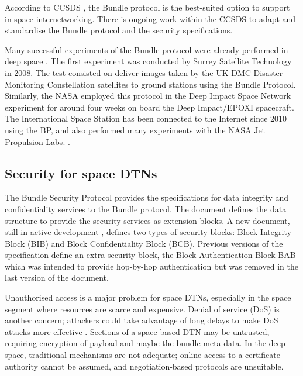 According to CCSDS \cite{rationale2010requirements}, the Bundle protocol is the best-suited option to support in-space internetworking. There is ongoing work within the CCSDS to adapt and standardise the Bundle protocol and the security specifications. %

Many successful experiments of the Bundle protocol were already performed in deep space  \cite{ivancic2010experience}. The first experiment was conducted by Surrey Satellite Technology in 2008. The test consisted on deliver images taken by the UK-DMC Disaster Monitoring Constellation satellites to ground stations using the Bundle Protocol. Similarly, the NASA employed this protocol in the Deep Impact Space Network experiment for around four weeks on board the Deep Impact/EPOXI spacecraft. The International Space Station has been connected to the Internet since 2010 using the BP, and also performed many experiments with the NASA Jet Propulsion Labs. \cite{araniti2015contact}.    


\subsection{Security for space DTNs}


 
 
The Bundle Security Protocol \cite{rfc6257} provides the specifications for data integrity and confidentiality services to the Bundle protocol. The document defines the data structure to provide the security services as extension blocks. A new document, still in active development \cite{ietf-dtn-bpsec-07}, defines two types of security blocks: Block Integrity Block (BIB) and Block Confidentiality Block (BCB). Previous versions of the specification define an extra security block, the Block Authentication Block BAB which was intended to provide hop-by-hop authentication but was removed in the last version of the document.     
 

Unauthorised access is a major problem for space DTNs, especially in the space segment where resources are scarce and expensive. Denial of service (DoS) is another concern; attackers could take advantage of long delays to make DoS attacks more effective \cite{rfc6257}. Sections of a space-based DTN may be untrusted, requiring encryption of payload and maybe the bundle meta-data. In the deep space, traditional mechanisms are not adequate; online access to a certificate authority cannot be assumed, and negotiation-based protocols are unsuitable.
 
